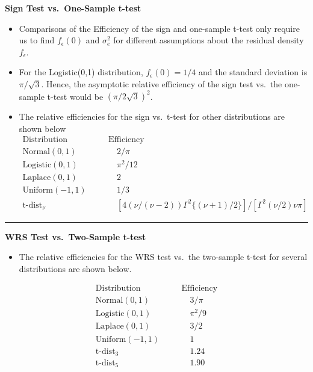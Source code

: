 \documentclass[]{book}
\providecommand{\tightlist}{%
  \setlength{\itemsep}{0pt}\setlength{\parskip}{0pt}}
\begin{document}
\textbf{Sign Test vs.~One-Sample t-test}

\begin{itemize}
\item
  Comparisons of the Efficiency of the sign and one-sample t-test only
  require us to find \(f_{\epsilon}(0)\) and \(\sigma_{e}^{2}\) for different assumptions
  about the residual density \(f_{\epsilon}\).
\item
  For the Logistic(0,1) distribution, \(f_{\epsilon}(0) = 1/4\) and the standard deviation
  is \(\pi/\sqrt{3}\). Hence, the asymptotic relative efficiency of the sign test vs.~the one-sample
  t-test would be \((\pi/2\sqrt{3})^{2}\).
\item
  The relative efficiencies for the sign vs.~t-test for other distributions are shown below
  \begin{eqnarray}
  \textrm{Distribution} & & \quad \textrm{Efficiency} \\
  \textrm{Normal}(0,1) & & \qquad 2/\pi \\
  \textrm{Logistic}(0,1) & &  \qquad \pi^{2}/12 \\
  \textrm{Laplace}(0,1) & & \qquad 2 \\
  \textrm{Uniform}(-1, 1) & & \qquad 1/3 \\
  \textrm{t-dist}_{\nu} & & \qquad [4(\nu/(\nu-2))\Gamma^{2}\{ (\nu + 1)/2\}]/[ \Gamma^{2}(\nu/2)\nu \pi ]
  \end{eqnarray}
\end{itemize}

\begin{center}\rule{0.5\linewidth}{\linethickness}\end{center}

\textbf{WRS Test vs.~Two-Sample t-test}

\begin{itemize}
\tightlist
\item
  The relative efficiencies for the WRS test vs.~the two-sample t-test
  for several distributions are shown below.
\end{itemize}

\begin{eqnarray}
\textrm{Distribution} & & \quad \textrm{Efficiency} \\
\textrm{Normal}(0,1) & & \qquad 3/\pi \\
\textrm{Logistic}(0,1) & &  \qquad \pi^{2}/9 \\
\textrm{Laplace}(0,1) & & \qquad 3/2 \\
\textrm{Uniform}(-1, 1) & & \qquad 1 \\
\textrm{t-dist}_{3} & & \qquad 1.24 \\
\textrm{t-dist}_{5} & & \qquad 1.90 \\
\end{eqnarray}
\end{document}
